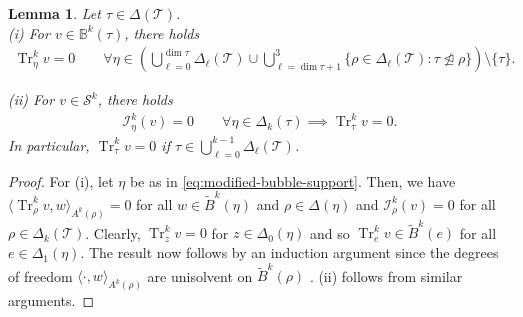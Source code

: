 \documentclass{mcom-l}
\newtheorem{lemma}[theorem]{Lemma}
\theoremstyle{definition}
\theoremstyle{remark}
\numberwithin{equation}{section}
\DeclareMathOperator{\Tr}{Tr}
\DeclareMathOperator{\notsubsimplex}{\ntrianglelefteq}
\newcommand{\mesh}[0]{\mathcal{T}}
\begin{document}
\begin{lemma}
	\label{lem:support-skeleton-extended-bubble}
	Let $\tau \in \Delta(\mesh)$. \\
	\noindent (i) For $v \in \mathbb{B}^k(\tau)$,
	there holds
	\begin{align}
		\label{eq:modified-bubble-support}
		\Tr^k_{\eta} v = 0 \qquad \forall \eta \in 
		\left( \bigcup_{\ell=0}^{\dim \tau} \Delta_{\ell}(\mesh) 
		\cup \bigcup_{\ell=\dim \tau + 1}^{3} 
		\{ \rho \in \Delta_{\ell}(\mesh) : \tau \notsubsimplex \rho \}
		\right) \setminus \{\tau\}.
	\end{align}
	
	\noindent (ii)  For $v \in \mathcal{S}^k$, 
	there holds
	\begin{align}
		\label{eq:skeletal-support}
		\mathcal{I}^k_{\eta}(v) = 0 \qquad \forall \eta \in \Delta_k(\tau)
		\implies \Tr^k_{\tau} v = 0.
	\end{align}
	In particular, $\Tr^k_{\tau} v = 0$ if
	$\tau \in \bigcup_{\ell = 0}^{k-1} \Delta_{\ell}(\mesh)$.
\end{lemma}
\begin{proof}
	For (i), let $\eta$ be as in \cref{eq:modified-bubble-support}. Then, 
	we have $\langle \Tr^{k}_{\rho} v, w \rangle_{A^k(\rho)} = 0$
	for all $w \in \tilde{B}^k(\eta)$ and 
	$\rho \in \Delta(\eta)$ and $\mathcal{I}^k_{\rho}(v) = 0$
	for all $\rho \in \Delta_k(\mesh)$. Clearly, $\Tr^k_{z} v = 0$
	for $z \in \Delta_0(\eta)$ and so $\Tr^k_{e} v \in \tilde{B}^k(e)$
	for all $e \in \Delta_1(\eta)$. The result now follows by an induction 
	argument since the degrees of freedom $\langle \cdot, w \rangle_{A^k(\rho)}$
	are unisolvent on $\tilde{B}^k(\rho)$ \cite[Lemma 5.2]{HuLiangLin25}. 
	(ii) follows from similar arguments. 
\end{proof}
\end{document}

